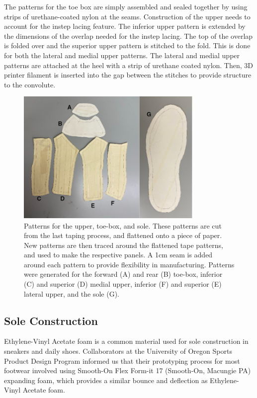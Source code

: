 \documentclass[defaultstyle,11pt]{thesis}
\begin{document}
The patterns for the toe box are simply assembled and sealed together by using strips of urethane-coated nylon at the seams.
Construction of the upper needs to account for the instep lacing feature.
The inferior upper pattern is extended by the dimensions of the overlap needed for the instep lacing.
The top of the overlap is folded over and the superior upper pattern is stitched to the fold.
This is done for both the lateral and medial upper patterns.
The lateral and medial upper patterns are attached at the heel with a strip of urethane coated nylon.
Then, 3D printer filament is inserted into the gap between the stitches to provide structure to the convolute.

\begin{figure}
\hypertarget{fig:SA3-cutpatterns}{%
\centering
\includegraphics[width=0.8\textwidth,height=\textheight]{../fig/SA3/cut_patterns.png}
\caption{Patterns for the upper, toe-box, and sole. These patterns are cut from the last taping process, and flattened onto a piece of paper. New patterns are then traced around the flattened tape patterns, and used to make the respective panels. A 1cm seam is added around each pattern to provide flexibility in manufacturing. Patterns were generated for the forward (A) and rear (B) toe-box, inferior (C) and superior (D) medial upper, inferior (F) and superior (E) lateral upper, and the sole (G).}\label{fig:SA3-cutpatterns}
}
\end{figure}

\hypertarget{sole-construction}{%
\subsection{Sole Construction}\label{sole-construction}}

Ethylene-Vinyl Acetate foam is a common material used for sole construction in sneakers and daily shoes.
Collaborators at the University of Oregon Sports Product Design Program informed us that their prototyping process for most footwear involved using Smooth-On Flex Form-it 17 (Smooth-On, Macungie PA) expanding foam, which provides a similar bounce and deflection as Ethylene-Vinyl Acetate foam.
\end{document}
